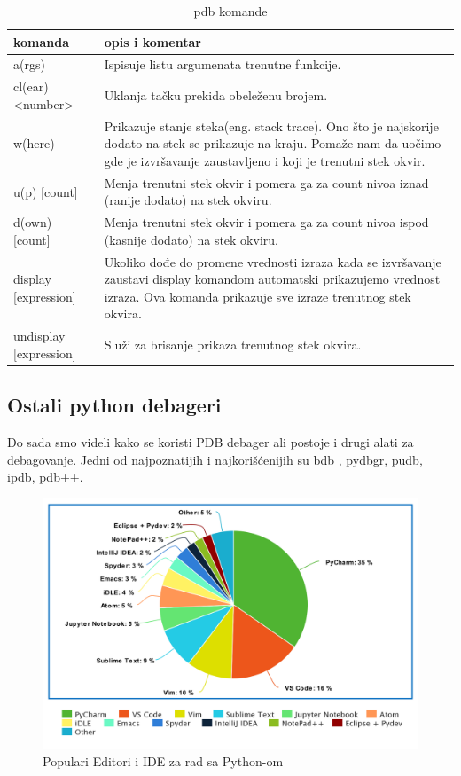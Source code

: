 \documentclass[a4paper]{article}
\begin{document}
\begin{table}[h!]
\begin{center}
\caption{pdb komande}
 \begin{tabular}{||p{4cm} p{7cm}||} 
 \hline
  komanda &      opis i komentar \\ [2.0ex] 
 \hline\hline
  a(rgs) & Ispisuje listu argumenata trenutne funkcije.  \\  [2ex]   
 \hline
 cl(ear) <number> & Uklanja tačku prekida obeleženu brojem.  \\ [2ex]
 \hline
 w(here) & Prikazuje stanje steka(eng. stack trace). Ono što je najskorije dodato na stek se prikazuje na kraju. Pomaže nam da uočimo gde je izvršavanje zaustavljeno i koji je trenutni stek okvir. \\ [2ex]
 \hline
 u(p) [count] & Menja trenutni stek okvir i pomera ga za count nivoa iznad (ranije dodato) na stek okviru.  \\ [2ex]
  \hline
 d(own) [count] & Menja trenutni stek okvir i pomera ga za count nivoa ispod (kasnije dodato) na stek okviru.  \\ [2ex] 
 \hline
  \hline
 display [expression] & Ukoliko dođe do promene vrednosti izraza kada se izvršavanje zaustavi display komandom automatski prikazujemo vrednost izraza. Ova komanda prikazuje sve izraze trenutnog stek okvira.\\ [2ex] 
 \hline
 \hline
 undisplay [expression] & Služi za brisanje prikaza trenutnog stek okvira.  \\ [2ex] 
 \hline
\end{tabular}
\label{tab:tabela1}
\end{center}
\end{table}

\subsection{Ostali python debageri}
Do sada smo videli kako se koristi PDB debager ali postoje i drugi alati za debagovanje. Jedni od najpoznatijih i najkorišćenijih su bdb \cite{bdbDocPyt}, pydbgr, pudb, ipdb, pdb++.
\begin{figure}[h!]
\begin{center}
\includegraphics[scale=0.25]{pie.png}
\end{center}
\caption{Populari Editori i IDE za rad sa Python-om}
\label{fig:pie}
\end{figure}
\end{document}
